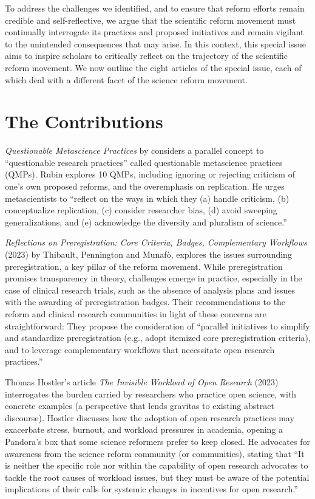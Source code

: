 \documentclass[authordate, editorial,noabstract]{jote-new-article}
\begin{document}
To address the challenges we identified, and to ensure that reform efforts remain credible and self-reflective, we argue that the scientific reform movement must continually interrogate its practices and proposed initiatives and remain vigilant to the unintended consequences that may arise. In this context, this special issue aims to inspire scholars to critically reflect on the trajectory of the scientific reform movement. We now outline the eight articles of the special issue, each of which deal with a different facet of the science reform movement.



\section{The Contributions}



\emph{Questionable Metascience Practices} by \textcite{Mark Rubin2023} considers a parallel concept to “questionable research practices” called questionable metascience practices (QMPs). Rubin explores 10 QMPs, including ignoring or rejecting criticism of one's own proposed reforms, and the overemphasis on replication. He urges metascientists to “reflect on the ways in which they (a) handle criticism, (b) conceptualize replication, (c) consider researcher bias, (d) avoid sweeping generalizations, and (e) acknowledge the diversity and pluralism of science.”



\emph{Reflections on Preregistration: Core Criteria, Badges, Complementary Workflows }(2023) by Thibault, Pennington and Munafò, explores the issues surrounding preregistration, a key pillar of the reform movement. While preregistration promises transparency in theory, challenges emerge in practice, especially in the case of clinical research trials, such as the absence of analysis plans and issues with the awarding of preregistration badges. Their recommendations to the reform and clinical research communities in light of these concerns are straightforward: They propose the consideration of “parallel initiatives to simplify and standardize preregistration (e.g., adopt itemized core preregistration criteria), and to leverage complementary workflows that necessitate open research practices.”



Thomas Hostler's article \emph{The Invisible Workload of Open Research} (2023) interrogates the burden carried by researchers who practice open science, with concrete examples (a perspective that lends gravitas to existing abstract discourse)\emph{.} Hostler discusses how the adoption of open research practices may exacerbate stress, burnout, and workload pressures in academia, opening a Pandora's box that some science reformers prefer to keep closed. He advocates for awareness from the science reform community (or communities), stating that “It is neither the specific role nor within the capability of open research advocates to tackle the root causes of workload issues, but they must be aware of the potential implications of their calls for systemic changes in incentives for open research.”
\end{document}
